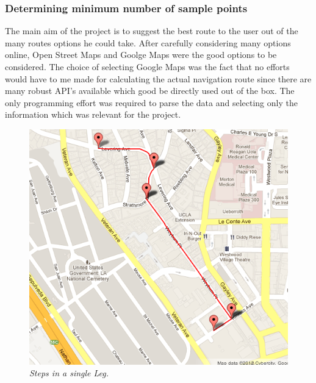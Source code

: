 \documentclass[10pt]{sigplan-proc-varsize}
\begin{document}
\subsubsection{Determining minimum number of sample points}
The main aim of the project is to suggest the best route to the user out of the many routes options he could take. After carefully considering many options online, Open Street Maps \cite{openStreetMap} and Goolge Maps \cite{googleMapsOriginal} were the good options to be considered. The choice of selecting Google Maps was the fact that no efforts would have to me made for calculating the actual navigation route since there are many robust API's available which good be directly used out of the box. The only programming effort was required to parse the data and selecting only the information which was relevant for the project. 

\begin{figure}
\begin{center}
\includegraphics[scale=0.35]{stepsInALeg.png}
\caption{\small \sl Steps in a single Leg.\label{fig:stepsInALeg}}
\end{center}
\end{figure}
\end{document}
